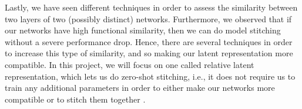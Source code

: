 \documentclass[../main.tex]{subfiles}
\begin{document}
Lastly, we have seen different techniques in order to assess the similarity between two layers of two (possibly distinct) networks. Furthermore, we observed that if our networks have high functional similarity, then we can do model stitching without a severe performance drop. Hence, there are several techniques in order to increase this type of similarity, and so making our latent representation more compatible. In this project, we will focus on one called relative latent representation, which lets us do zero-shot stitching, i.e., it does not require us to train any additional parameters in order to either make our networks more compatible or to stitch them together \cite{moschella_relative_2022}.  
\end{document}
